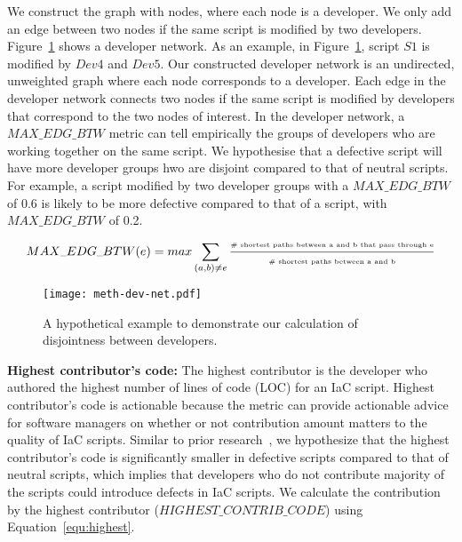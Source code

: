 \documentclass[smallextended]{svjour3}       %
\begin{document}
We construct the graph with nodes, where each node is a developer. We only add an edge between two nodes if the same script is modified by two developers. Figure~\ref{fig-meth-dev-net} shows a developer network. As an example, in Figure~\ref{fig-meth-dev-net}, script $S1$ is modified by $Dev4$ and $Dev5$.  Our constructed developer network is an undirected, unweighted graph where each node corresponds to a developer. Each edge in the developer network connects two nodes if the same script is modified by developers that correspond to the two nodes of interest. In the developer network, a $MAX\_EDG\_BTW$ metric can tell empirically the groups of developers who are working together on the same script. We hypothesise that a defective script will have more developer groups hwo are disjoint compared to that of neutral scripts. For example, a script modified by two developer groups with a $MAX\_EDG\_BTW$ of 0.6 is likely to be more defective compared to that of a script, with $MAX\_EDG\_BTW$ of 0.2.  


\begin{equation}
\tiny{MAX\_EDG\_BTW (e)}= max \sum\limits_{(a,b) \neq e} \frac{\text{\tiny{\# shortest paths between a and b that pass through e}}}{\text{\tiny{\# shortest paths between a and b}}}
\label{equ:max:edge:betw}
\end{equation}


\begin{figure}[]
\centering
\texttt{[image: meth-dev-net.pdf]}
\caption{A hypothetical example to demonstrate our calculation of disjointness between developers.}
\setlength\abovecaptionskip{-2pt}
\setlength\belowcaptionskip{-2pt}
\label{fig-meth-dev-net}
\end{figure}

\textbf{Highest contributor's code:} The highest contributor is the developer who authored the highest number of lines of code (LOC) for an IaC script. Highest contributor's code is actionable because the metric can provide actionable advice for software managers on whether or not contribution amount matters to the quality of IaC scripts. Similar to prior research~\citep{Devanbu:Process:Better}, we hypothesize that the highest contributor's code is significantly smaller in defective scripts compared to that of neutral scripts, which implies that developers who do not contribute majority of the scripts could introduce defects in IaC scripts. We calculate the contribution by the highest contributor ($HIGHEST\_CONTRIB\_CODE$) using Equation~\ref{equ:highest}.  
\end{document}
